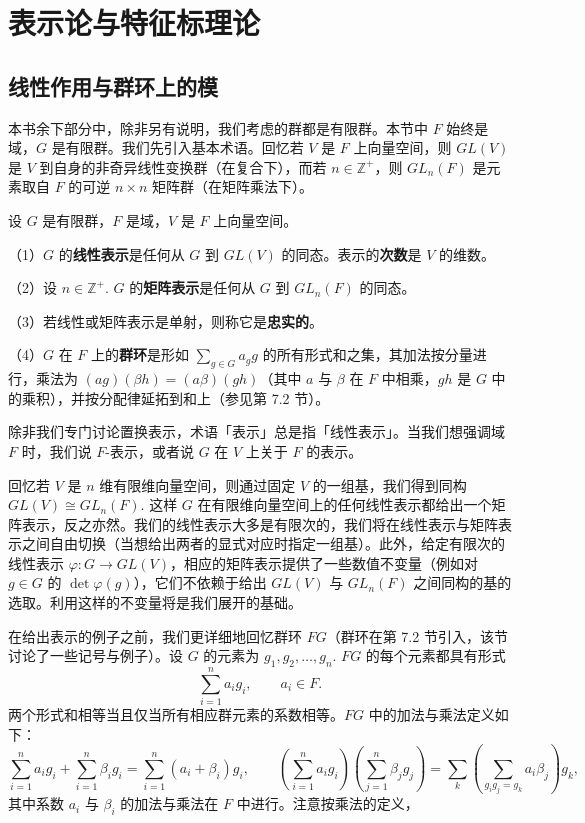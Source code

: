 
\setcounter{chapter}{17}

\chapter{表示论与特征标理论}

\section{线性作用与群环上的模}

本书余下部分中，除非另有说明，我们考虑的群都是有限群。本节中 \(F\) 始终是域，\(G\) 是有限群。我们先引入基本术语。回忆若 \(V\) 是 \(F\) 上向量空间，则 \(GL(V)\) 是 \(V\) 到自身的非奇异线性变换群（在复合下），而若 \(n \in \mathbb{Z}^+\)，则 \(GL_n(F)\) 是元素取自 \(F\) 的可逆 \(n \times n\) 矩阵群（在矩阵乘法下）。

\begin{definition}
设 \(G\) 是有限群，\(F\) 是域，\(V\) 是 \(F\) 上向量空间。

（1）\(G\) 的\textbf{线性表示}是任何从 \(G\) 到 \(GL(V)\) 的同态。表示的\textbf{次数}是 \(V\) 的维数。

（2）设 \(n \in \mathbb{Z}^+\). \(G\) 的\textbf{矩阵表示}是任何从 \(G\) 到 \(GL_n(F)\) 的同态。

（3）若线性或矩阵表示是单射，则称它是\textbf{忠实的}。

（4）\(G\) 在 \(F\) 上的\textbf{群环}是形如 \(\sum_{g \in G}a_gg\) 的所有形式和之集，其加法按分量进行，乘法为 \((ag)(\beta h) = (a\beta)(gh)\)（其中 \(a\) 与 \(\beta\) 在 \(F\) 中相乘，\(gh\) 是 \(G\) 中的乘积），并按分配律延拓到和上（参见第 7.2 节）。
\end{definition}

除非我们专门讨论置换表示，术语「表示」总是指「线性表示」。当我们想强调域 \(F\) 时，我们说 \(F\)-表示，或者说 \(G\) 在 \(V\) 上关于 \(F\) 的表示。

回忆若 \(V\) 是 \(n\) 维有限维向量空间，则通过固定 \(V\) 的一组基，我们得到同构 \(GL(V) \cong GL_n(F)\). 这样 \(G\) 在有限维向量空间上的任何线性表示都给出一个矩阵表示，反之亦然。我们的线性表示大多是有限次的，我们将在线性表示与矩阵表示之间自由切换（当想给出两者的显式对应时指定一组基）。此外，给定有限次的线性表示 \(\varphi : G \to GL(V)\)，相应的矩阵表示提供了一些数值不变量（例如对 \(g \in G\) 的 \(\det\varphi(g)\)），它们不依赖于给出 \(GL(V)\) 与 \(GL_n(F)\) 之间同构的基的选取。利用这样的不变量将是我们展开的基础。

在给出表示的例子之前，我们更详细地回忆群环 \(FG\)（群环在第 7.2 节引入，该节讨论了一些记号与例子）。设 \(G\) 的元素为 \(g_1, g_2, \ldots, g_n\). \(FG\) 的每个元素都具有形式
\[
\sum_{i=1}^{n}a_ig_i, \qquad a_i \in F.
\]
两个形式和相等当且仅当所有相应群元素的系数相等。\(FG\) 中的加法与乘法定义如下：
\[
\sum_{i=1}^{n}a_ig_i+\sum_{i=1}^{n}\beta_ig_i = \sum_{i=1}^{n}(a_i+\beta_i)g_i, \qquad \left(\sum_{i=1}^{n}a_ig_i\right)\left(\sum_{j=1}^{n}\beta_jg_j\right) = \sum_{k}\left(\sum_{g_ig_j = g_k}a_i\beta_j\right)g_k,
\]
其中系数 \(a_i\) 与 \(\beta_i\) 的加法与乘法在 \(F\) 中进行。注意按乘法的定义，

